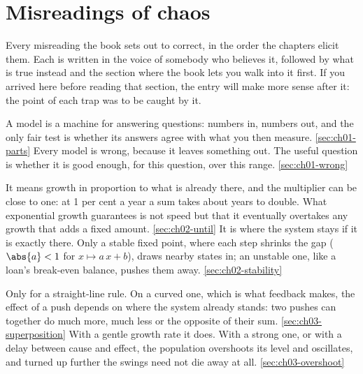 
\chapter{Misreadings of chaos}
\label{app:misreadings}

\noindent
Every misreading the book sets out to correct, in the order the chapters elicit them. Each is written in the voice of somebody who believes it, followed by what is true instead and the section where the book lets you walk into it first. If you arrived here before reading that section, the entry will make more sense after it: the point of each trap was to be caught by it.

%
  {A model is a machine for answering questions: numbers in, numbers out, and the only fair test is whether its answers agree with what you then measure.}%
  {\ref{sec:ch01-parts}}
%
  {Every model is wrong, because it leaves something out. The useful question is whether it is good enough, for this question, over this range.}%
  {\ref{sec:ch01-wrong}}

%
  {It means growth in proportion to what is already there, and the multiplier can be close to one: at 1 per cent a year a sum takes about  years to double. What exponential growth guarantees is not speed but that it eventually overtakes any growth that adds a fixed amount.}%
  {\ref{sec:ch02-until}}
%
  {It is where the system stays if it is exactly there. Only a stable fixed point, where each step shrinks the gap ($\abs{a} < 1$ for $x \mapsto a\,x + b$), draws nearby states in; an unstable one, like a loan's break-even balance, pushes them away.}%
  {\ref{sec:ch02-stability}}

%
  {Only for a straight-line rule. On a curved one, which is what feedback makes, the effect of a push depends on where the system already stands: two pushes can together do much more, much less or the opposite of their sum.}%
  {\ref{sec:ch03-superposition}}
%
  {With a gentle growth rate it does. With a strong one, or with a delay between cause and effect, the population overshoots its level and oscillates, and turned up further the swings need not die away at all.}%
  {\ref{sec:ch03-overshoot}}

